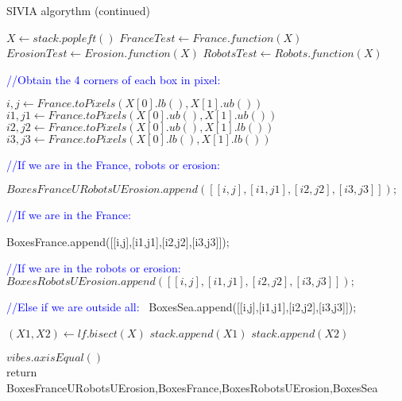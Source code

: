 \begin{algorithm}
  \caption{SIVIA algorythm (continued)}
  \begin{algorithmic}
	
		\vspace{0.3 cm}
	
  		\STATE $X\gets stack.popleft()$
		\STATE $FranceTest\gets France.function(X)$
		\STATE $ErosionTest\gets Erosion.function(X)$ 
		\STATE $RobotsTest\gets Robots.function(X)$

		\vspace{0.3 cm}

  		\textcolor{blue}{//Obtain the 4 corners of each box in pixel:}\
  		 
  		
  		\STATE $i,j\gets France.toPixels(X[0].lb(),X[1].ub())$
		\STATE $i1,j1\gets France.toPixels(X[0].ub(),X[1].ub())$
		\STATE $i2,j2\gets France.toPixels(X[0].ub(),X[1].lb())$ 
		\STATE $i3,j3\gets France.toPixels(X[0].lb(),X[1].lb())$
		\vspace{0.3 cm}
		
	 	\textcolor{blue}{//If we are in the France, robots or erosion:}\
	 	
     		\STATE $BoxesFranceURobotsUErosion.append([[i,j],[i1,j1],[i2,j2],[i3,j3]]);$
     		\vspace{0.3 cm}
     	
     	\textcolor{blue}{//If we are in the France:}\

     		\STATE BoxesFrance.append([[i,j],[i1,j1],[i2,j2],[i3,j3]]);
	 	\ENDIF
	 	
	 	\vspace{0.3 cm}
	 	
	 	\textcolor{blue}{//If we are in the robots or erosion:}\
     		\STATE $BoxesRobotsUErosion.append([[i,j],[i1,j1],[i2,j2],[i3,j3]]);$
	 	 
	
	 	 \ENDIF
	 	 
	 	 \vspace{0.3 cm}
     		
     	\textcolor{blue}{//Else if we are outside all:}\
	 	 \STATE BoxesSea.append([[i,j],[i1,j1],[i2,j2],[i3,j3]]);
	 	 
     	\ELSE
     
          			\STATE $(X1, X2)\gets lf.bisect(X)$
          			\STATE $stack.append(X1)$
         			\STATE $stack.append(X2)$
         		\ENDIF
         	
  		\ENDIF
 	 \ENDWHILE 
	
	\vspace{0.3 cm}
	
  \STATE $vibes.axisEqual()$\\
  return BoxesFranceURobotsUErosion,BoxesFrance,BoxesRobotsUErosion,BoxesSea


  \end{algorithmic}
\end{algorithm}

